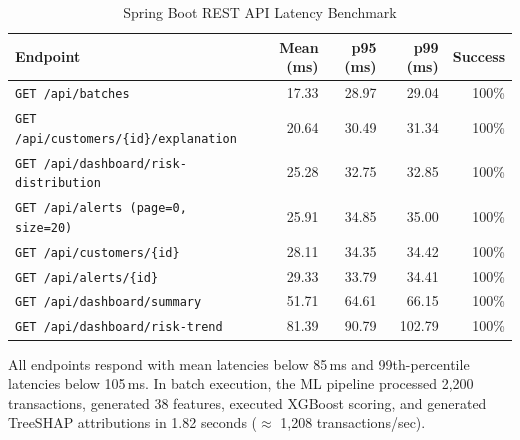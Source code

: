 \documentclass[conference]{IEEEtran}
\begin{document}
\begin{table}[t]
\centering
\caption{Spring Boot REST API Latency Benchmark}
\label{tab:api_perf}
\small
\begin{tabular}{lrrrr}
\toprule
\textbf{Endpoint} & \textbf{Mean (ms)} & \textbf{p95 (ms)} & \textbf{p99 (ms)} & \textbf{Success} \\
\midrule
\texttt{GET /api/batches} & 17.33 & 28.97 & 29.04 & 100\% \\
\texttt{GET /api/customers/\{id\}/explanation} & 20.64 & 30.49 & 31.34 & 100\% \\
\texttt{GET /api/dashboard/risk-distribution} & 25.28 & 32.75 & 32.85 & 100\% \\
\texttt{GET /api/alerts (page=0, size=20)} & 25.91 & 34.85 & 35.00 & 100\% \\
\texttt{GET /api/customers/\{id\}} & 28.11 & 34.35 & 34.42 & 100\% \\
\texttt{GET /api/alerts/\{id\}} & 29.33 & 33.79 & 34.41 & 100\% \\
\texttt{GET /api/dashboard/summary} & 51.71 & 64.61 & 66.15 & 100\% \\
\texttt{GET /api/dashboard/risk-trend} & 81.39 & 90.79 & 102.79 & 100\% \\
\bottomrule
\end{tabular}
\end{table}

All endpoints respond with mean latencies below 85\,ms and 99th-percentile latencies below 105\,ms. In batch execution, the ML pipeline processed 2,200 transactions, generated 38 features, executed XGBoost scoring, and generated TreeSHAP attributions in 1.82 seconds ($\approx$ 1,208 transactions/sec).
\end{document}
